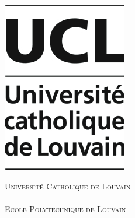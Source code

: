 \begin{titlepage}
\begin{center}
 
\begin{minipage}{0.20\textwidth}
\includegraphics[width=\textwidth]{img/ucl-official}
\end{minipage}
\begin{minipage}{0.58\textwidth}
\begin{center}
\textsc{\Large Université Catholique de Louvain}\\
~ \\
\textsc{\Large Ecole Polytechnique de Louvain}\\
\end{center}
\end{minipage}
\begin{minipage}{0.20\textwidth}

\end{minipage}
\end{center}
\end{titlepage}
